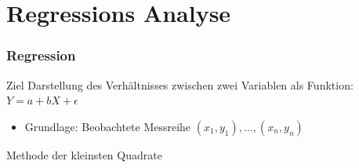 \documentclass{beamer}
\begin{document}
\section{Regressions Analyse}

\begin{frame}
 \frametitle{Regression}
 
 \begin{block}{Ziel}
  Darstellung des Verh\"altnisses zwischen zwei Variablen als Funktion:\\
  \centering $Y = a + bX + \epsilon$
 \end{block}


 \begin{itemize}
  \item Grundlage: Beobachtete Messreihe $(x_1, y_1), \dots, (x_n, y_n)$
 \end{itemize}

 \pause

 \begin{block}{Methode der kleinsten Quadrate}
  \centering
  \\
 \end{block}

 


\end{frame}
\end{document}

